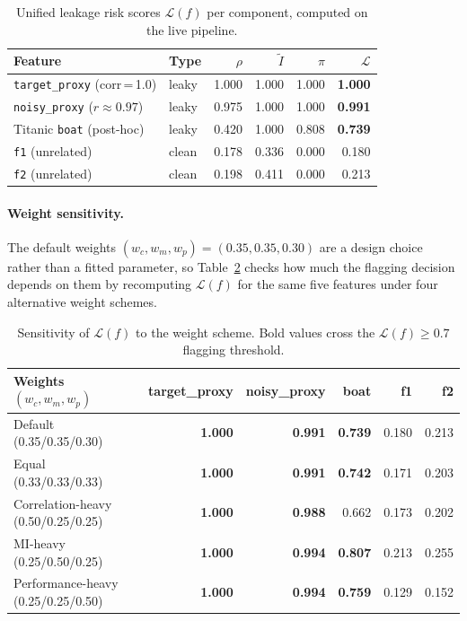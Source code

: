 \documentclass[12pt,a4paper]{report}
\newcommand{\tblhead}{\rowcolor{tblHeadBg}\color{white}\bfseries}
\begin{document}
\begin{table}[!ht]
\centering
\caption{Unified leakage risk scores $\mathcal{L}(f)$ per component, computed on the live
  pipeline.}
\label{tab:lrs}
\scriptsize
{}
\begin{tabular}{llrrrr}
\toprule
\tblhead \textbf{Feature} & \textbf{Type} & $\rho$ & $\tilde{I}$ & $\pi$ & $\mathcal{L}$ \\
\midrule
\texttt{target\_proxy} (corr\,=\,1.0)   & leaky  & 1.000 & 1.000 & 1.000 & \textbf{1.000} \\
\texttt{noisy\_proxy} ($r{\approx}0.97$) & leaky  & 0.975 & 1.000 & 1.000 & \textbf{0.991} \\
Titanic \texttt{boat} (post-hoc)        & leaky  & 0.420 & 1.000 & 0.808 & \textbf{0.739} \\
\texttt{f1} (unrelated)                 & clean  & 0.178 & 0.336 & 0.000 & 0.180 \\
\texttt{f2} (unrelated)                 & clean  & 0.198 & 0.411 & 0.000 & 0.213 \\
\bottomrule
\end{tabular}
\end{table}

\paragraph{Weight sensitivity.}
The default weights $(w_c, w_m, w_p) = (0.35, 0.35, 0.30)$ are a design choice rather than
a fitted parameter, so Table~\ref{tab:lrs_ablation} checks how much the flagging decision
depends on them by recomputing $\mathcal{L}(f)$ for the same five features under four
alternative weight schemes.

\begin{table}[!ht]
\centering
\caption{Sensitivity of $\mathcal{L}(f)$ to the weight scheme. Bold values cross the
  $\mathcal{L}(f)\ge0.7$ flagging threshold.}
\label{tab:lrs_ablation}
\scriptsize
{}
\begin{tabular}{lrrrrr}
\toprule
\tblhead \textbf{Weights $(w_c,w_m,w_p)$} & \textbf{target\_proxy} & \textbf{noisy\_proxy} & \textbf{boat} & \textbf{f1} & \textbf{f2} \\
\midrule
Default (0.35/0.35/0.30)           & \textbf{1.000} & \textbf{0.991} & \textbf{0.739} & 0.180 & 0.213 \\
Equal (0.33/0.33/0.33)             & \textbf{1.000} & \textbf{0.991} & \textbf{0.742} & 0.171 & 0.203 \\
Correlation-heavy (0.50/0.25/0.25) & \textbf{1.000} & \textbf{0.988} & 0.662 & 0.173 & 0.202 \\
MI-heavy (0.25/0.50/0.25)          & \textbf{1.000} & \textbf{0.994} & \textbf{0.807} & 0.213 & 0.255 \\
Performance-heavy (0.25/0.25/0.50) & \textbf{1.000} & \textbf{0.994} & \textbf{0.759} & 0.129 & 0.152 \\
\bottomrule
\end{tabular}
\end{table}
\end{document}
